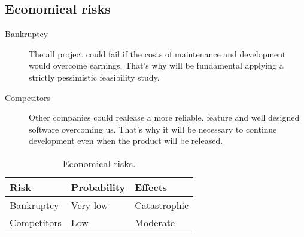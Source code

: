 \subsection{Economical risks}


\begin{description}
    \item[Bankruptcy] The all project could fail if the costs of maintenance and development would overcome earnings.
    That's why will be fundamental applying a strictly pessimistic feasibility study.

    \item[Competitors] Other companies could realease a more reliable, feature and well designed software overcoming us. That's why it will be necessary to continue development even when the product will be released.
\end{description}

\begin{table}[p]
\centering
    \begin{tabular}{| l | l | l |}
        \hline
        \textbf{Risk}       & \textbf{Probability}  & \textbf{Effects}  \\
        \hline
        Bankruptcy          & Very low             & Catastrophic      \\
        \hline
        Competitors         & Low              & Moderate            \\
        \hline
    \end{tabular}
    \caption{Economical risks.}
    \label{tab:economical-risks}
\end{table}